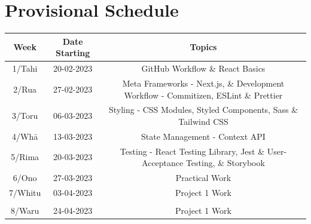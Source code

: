 \documentclass{article}
\begin{document}
\section*{Provisional Schedule}
\renewcommand{\arraystretch}{1.5}
\begin{tabular}{|c|c|c|c|}
	\hline
	\textbf{Week}                  & \textbf{Date Starting}            & \multicolumn{2}{c|}{\textbf{Topics}}                                                                                             \\ \hline
	\footnotesize 1/Tahi           & \footnotesize 20-02-2023 & \multicolumn{2}{c|}{\footnotesize GitHub Workflow \& React Basics}    \\ \hline
	\footnotesize 2/Rua            & \footnotesize 27-02-2023 & \multicolumn{2}{c|}{\footnotesize Meta Frameworks - Next.js, \& Development Workflow - Commitizen, ESLint \& Prettier}                   \\ \hline
	\footnotesize 3/Toru           & \footnotesize 06-03-2023 & \multicolumn{2}{c|}{\footnotesize Styling - CSS Modules, Styled Components, Sass \& Tailwind CSS} \\ \hline
	\footnotesize 4/Whā            & \footnotesize 13-03-2023 & \multicolumn{2}{c|}{\footnotesize State Management - Context API}                               \\ \hline
	\footnotesize 5/Rima           & \footnotesize 20-03-2023 & \multicolumn{2}{c|}{\footnotesize Testing - React Testing Library, Jest \& User-Acceptance Testing, \& Storybook}                                                \\ \hline
	\footnotesize 6/Ono            & \footnotesize 27-03-2023  & \multicolumn{2}{c|}{\footnotesize Practical Work}                                                   \\ \hline
	\footnotesize 7/Whitu          & \footnotesize 03-04-2023 &  \multicolumn{2}{c|}{\footnotesize Project 1 Work}                            \\ \hline
	\rowcolor{yellow} \multicolumn{4}{|c|}{\footnotesize Mid Term Break}                                                                                                                         \\ \hline
	\footnotesize 8/Waru   & \footnotesize 24-04-2023 & \multicolumn{2}{c|}{\footnotesize Project 1 Work}                                                   \\ \hline


\end{tabular}
\end{document}
